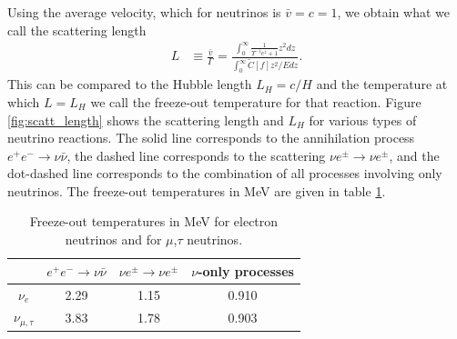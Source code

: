 Using the average velocity, which for neutrinos is $\bar v=c=1$, we obtain what we call the scattering length
\begin{align}
L&\equiv\frac{\bar v}{\Gamma}=\frac{\int_0^\infty\frac{1}{\Upsilon^{-1}e^z+1}z^2dz}{\int_0^\infty \tilde C[f] z^2/E dz}.
\end{align}
This can be compared to the Hubble length $L_H=c/H$ and the temperature at which $L=L_H$ we call the freeze-out temperature for that reaction.  Figure \ref{fig:scatt_length} shows the scattering length and $L_H$ for various types of neutrino reactions.  The solid line corresponds to the annihilation process $e^+e^-\rightarrow \nu\bar\nu$, the dashed line corresponds to the scattering $\nu e^\pm\rightarrow \nu e^\pm$, and the dot-dashed line corresponds to the combination of all processes involving only neutrinos.  The freeze-out temperatures in MeV are given in table \ref{table:freezeout_temp}.

\begin{table}[ht]
\centering 
\begin{tabular}{|c|c|c|c|}
\hline
              & $e^+e^-\rightarrow \nu\bar\nu$ & $\nu e^\pm\rightarrow \nu e^\pm$ & $\nu$-only processes\\
\hline
$\nu_e$ &2.29 & 1.15&0.910\\
\hline
$\nu_{\mu,\tau}$ &3.83 & 1.78& 0.903\\
\hline
\end{tabular}
\caption{Freeze-out temperatures in MeV for electron neutrinos and for $\mu$,$\tau$ neutrinos.}
\label{table:freezeout_temp}
\end{table}

